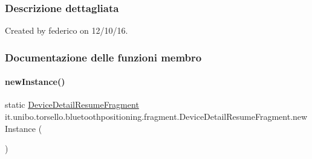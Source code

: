 \subsubsection{Descrizione dettagliata}
Created by federico on 12/10/16. 

\subsubsection{Documentazione delle funzioni membro}
\hypertarget{classit_1_1unibo_1_1torsello_1_1bluetoothpositioning_1_1fragment_1_1DeviceDetailResumeFragment_aab49893918bdd656328e6ee8021e1c52_aab49893918bdd656328e6ee8021e1c52}{}\label{classit_1_1unibo_1_1torsello_1_1bluetoothpositioning_1_1fragment_1_1DeviceDetailResumeFragment_aab49893918bdd656328e6ee8021e1c52_aab49893918bdd656328e6ee8021e1c52} 
\paragraph{\texorpdfstring{new\+Instance()}{newInstance()}}
{\footnotesize\ttfamily static \hyperlink{classit_1_1unibo_1_1torsello_1_1bluetoothpositioning_1_1fragment_1_1DeviceDetailResumeFragment}{Device\+Detail\+Resume\+Fragment} it.\+unibo.\+torsello.\+bluetoothpositioning.\+fragment.\+Device\+Detail\+Resume\+Fragment.\+new\+Instance (\begin{DoxyParamCaption}{ }\end{DoxyParamCaption})\hspace{0.3cm}{\ttfamily [static]}}


